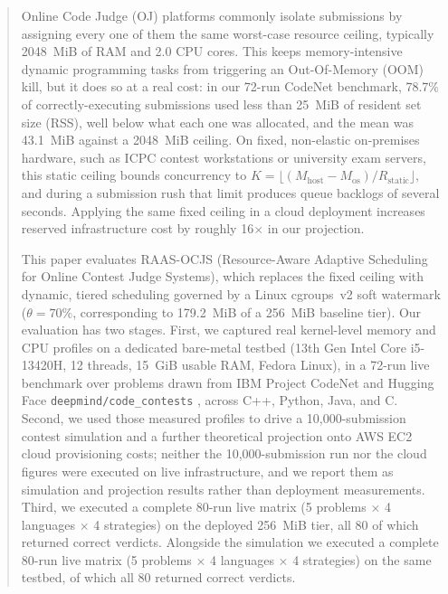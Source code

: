 \documentclass[conference]{IEEEtran}
\begin{document}
\maketitle

\begin{abstract}
Online Code Judge (OJ) platforms commonly isolate submissions by assigning every one of them the same worst-case resource ceiling, typically 2048~MiB of RAM and 2.0 CPU cores. This keeps memory-intensive dynamic programming tasks from triggering an Out-Of-Memory (OOM) kill, but it does so at a real cost: in our 72-run CodeNet benchmark, 78.7\% of correctly-executing submissions used less than 25~MiB of resident set size (RSS), well below what each one was allocated, and the mean was 43.1~MiB against a 2048~MiB ceiling. On fixed, non-elastic on-premises hardware, such as ICPC contest workstations or university exam servers, this static ceiling bounds concurrency to $K = \lfloor (M_{\mathrm{host}} - M_{\mathrm{os}}) / R_{\mathrm{static}} \rfloor$, and during a submission rush that limit produces queue backlogs of several seconds. Applying the same fixed ceiling in a cloud deployment increases reserved infrastructure cost by roughly 16$\times$ in our projection.

This paper evaluates RAAS-OCJS (Resource-Aware Adaptive Scheduling for Online Contest Judge Systems), which replaces the fixed ceiling with dynamic, tiered scheduling governed by a Linux cgroups~v2 soft watermark ($\theta = 70\%$, corresponding to 179.2~MiB of a 256~MiB baseline tier). Our evaluation has two stages. First, we captured real kernel-level memory and CPU profiles on a dedicated bare-metal testbed (13th Gen Intel Core i5-13420H, 12 threads, 15~GiB usable RAM, Fedora Linux), in a 72-run live benchmark over problems drawn from IBM Project CodeNet \cite{puri2021codenet} and Hugging Face \texttt{deepmind/code\_contests} \cite{li2022alphacode}, across C++, Python, Java, and C. Second, we used those measured profiles to drive a 10,000-submission contest simulation and a further theoretical projection onto AWS EC2 cloud provisioning costs; neither the 10,000-submission run nor the cloud figures were executed on live infrastructure, and we report them as simulation and projection results rather than deployment measurements. Third, we executed a complete 80-run live matrix (5 problems $\times$ 4 languages $\times$ 4 strategies) on the deployed 256~MiB tier, all 80 of which returned correct verdicts. Alongside the simulation we executed a complete 80-run live matrix (5 problems $\times$ 4 languages $\times$ 4 strategies) on the same testbed, of which all 80 returned correct verdicts.


\end{abstract}
\end{document}

